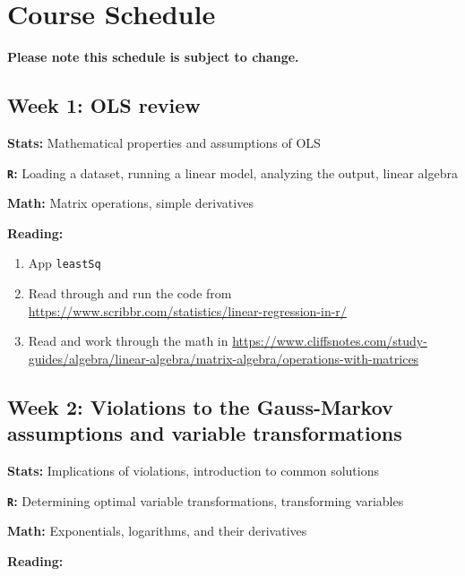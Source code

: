 \documentclass[12pt]{article}
\begin{document}
\section*{Course Schedule}

\textbf{Please note this schedule is subject to change.}

\subsection*{Week 1: OLS review}

\noindent \textbf{Stats:} Mathematical properties and assumptions of OLS

\noindent \textbf{\texttt{R}:} Loading a dataset, running a linear model, analyzing the output, linear algebra

\noindent \textbf{Math:} Matrix operations, simple derivatives

\noindent \textbf{Reading:}

\begin{enumerate}[1)]

\item App \texttt{leastSq}

\item Read through and run the code from \href{https://www.scribbr.com/statistics/linear-regression-in-r/}{https://www.scribbr.com/statistics/linear-regression-in-r/}

\item Read and work through the math in \href{https://www.cliffsnotes.com/study-guides/algebra/linear-algebra/matrix-algebra/operations-with-matrices}{https://www.cliffsnotes.com/study-guides/algebra/linear-algebra/matrix-algebra/operations-with-matrices}

\end{enumerate}

\subsection*{Week 2: Violations to the Gauss-Markov assumptions and variable transformations}

\noindent \textbf{Stats:} Implications of violations, introduction to common solutions

\noindent \textbf{\texttt{R}:} Determining optimal variable transformations, transforming variables

\noindent \textbf{Math:} Exponentials, logarithms, and their derivatives

\noindent \textbf{Reading:}
\end{document}
